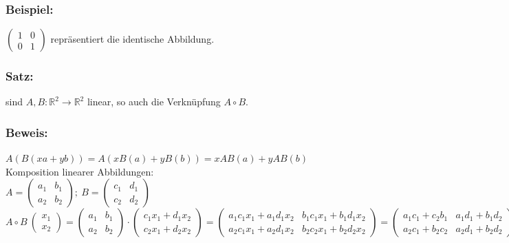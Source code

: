 \subsubsection{Beispiel: }
$\begin{pmatrix} 1 & 0 \\ 0 & 1 \end{pmatrix}$ repräsentiert die identische Abbildung.
%
%
%
\subsubsection{Satz: }
sind $A,B: \mathbb{R}^{2}\rightarrow \mathbb{R}^{2}$ linear, so auch die Verknüpfung $A \circ B$.
%
%
%
\subsubsection{Beweis:}
$A(B(xa+yb))=A(xB(a)+yB(b))=xAB(a)+yAB(b)$\\
Komposition linearer Abbildungen:\\
$A=\begin{pmatrix} a_{1} & b_{1} \\ a_{2} & b_{2} \end{pmatrix}; \ B=\begin{pmatrix} c_{1} & d_{1} \\ c_{2} & d_{2} \end{pmatrix}$ \\
$A \circ B \ \begin{pmatrix}x_{1} \\ x_{2} \end{pmatrix} = \begin{pmatrix}a_{1} & b_{1} \\ a_{2} & b_{2} \end{pmatrix} \cdot \begin{pmatrix} c_{1}x_{1} + d_{1} x_{2} \\ c_{2}x_{1} + d_{2}x_{2} \end{pmatrix} = \begin{pmatrix} a_{1}c_{1}x_{1} + a_{1}d_{1}x_{2} & b_{1}c_{1}x_{1} + b_{1}d_{1}x_{2} \\ a_{2}c_{1}x_{1} + a_{2}d_{1}x_{2} & b_{2}c_{2}x_{1} + b_{2} d_{2}x_{2} \end{pmatrix} = \begin{pmatrix} a_{1} c_{1} + c_{2} b_{1} & a_{1} d_{1} + b_{1} d_{2} \\ a_{2} c_{1} + b_{2} c_{2} & a_{2}d_{1} + b_{2}d_{2} \end{pmatrix} \ \begin{pmatrix} x_{1} \\ x_{2} \end{pmatrix}$\\
